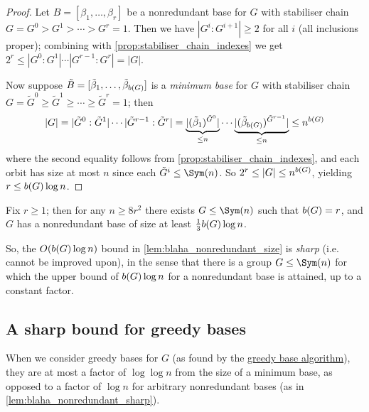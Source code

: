 \begin{proof}
    Let $B = [\beta_1,\dotsc,\beta_r]$ be a nonredundant base for $G$ with stabiliser chain $G = G^0 > G^1 > \dotsb > G^r = 1$. Then we have $|G^i : G^{i+1}| \geq 2$ for all $i$ (all inclusions proper); combining with \autoref{prop:stabiliser_chain_indexes} we get $2^r \leq |G^0 : G^1| \dotsb |G^{r-1} : G^r| = |G|$.

    Now suppose $\tilde B = [\tilde\beta_1,\dotsc,\tilde\beta_{\added{2}{b(G)}}]$ is a \textit{minimum base} for $G$ with stabiliser chain $G = \tilde G^0 \geq \tilde G^1 \geq \dotsb \geq \tilde G^r = 1$; then
    $$|G| = |\tilde G^0 : \tilde G^1| \dotsb |\tilde G^{r-1} : \tilde G^r| = \underbrace{|(\tilde\beta_1)^{\tilde G^0}|}_{\leq n} \dotsb \underbrace{|(\tilde\beta_{\added{2}{b(G)}})^{\tilde G^{r-1}}|}_{\leq n} \leq n^{\added{2}{b(G)}}$$
    where the second equality follows from \autoref{prop:stabiliser_chain_indexes}, and each orbit has size at most $n$ since each $\tilde G^i \leq \Sym(n)$. So $2^r \leq |G| \leq n^{\added{2}{b(G)}}$, yielding $r \leq \added{2}{b(G)}\log n$.
\end{proof}

\begin{lemma}\label{lem:blaha_nonredundant_sharp}
    Fix $r \geq 1$; then for any $n \geq 8r^2$ there exists $G \leq \Sym(n)$ such that $\added{2}{b(G)} = r$, and $G$ has a nonredundant base of size at least $\frac{1}{3}\added{2}{b(G)}\log n$.
\end{lemma}


So, the $O(\added{2}{b(G)}\log n)$ bound in \autoref{lem:blaha_nonredundant_size} is \textit{sharp} (i.e. cannot be improved upon), in the sense that  there is a group $G \leq \Sym(n)$ for which the upper bound of $\added{2}{b(G)}\log n$ for a nonredundant base is attained, up to a constant factor.

\subsection{A sharp bound for greedy bases}

When we consider greedy bases for $G$ (as found by the \hyperref[alg:blaha_greedy_base]{greedy base algorithm}), they are at most a factor of $\log\log n$ from the size of a minimum base, as opposed to a factor of $\log n$ for arbitrary nonredundant bases (as in \autoref{lem:blaha_nonredundant_sharp}).

